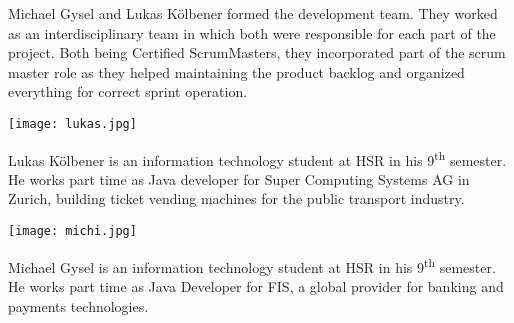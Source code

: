 Michael Gysel and Lukas Kölbener formed the development team. They worked as an interdisciplinary team in which both were responsible for each part of the project. Both being Certified ScrumMasters\textregistered\cite{scrummaster}, they incorporated part of the scrum master role as they helped maintaining the product backlog and organized everything for correct sprint operation.

\begin{minipage}[t]{0.25\textwidth}
	\vspace{0pt}
	\texttt{[image: lukas.jpg]}
\end{minipage}
\begin{minipage}[t]{0.8\textwidth}
	\vspace{20pt}
	Lukas Kölbener is an information technology student at \gls{HSR} in his 9\textsuperscript{th} semester. He works part time as Java developer for Super Computing Systems AG in Zurich, building ticket vending machines for the public transport industry.
	\newline
\end{minipage}

\begin{minipage}[t]{0.25\textwidth}
	\vspace{0pt}
	\texttt{[image: michi.jpg]}
\end{minipage}
\begin{minipage}[t]{0.8\textwidth}
	\vspace{20pt}
	Michael Gysel is an information technology student at \gls{HSR} in his 9\textsuperscript{th} semester. He works part time as Java Developer for FIS, a global provider for banking and payments technologies.
	\newline
\end{minipage}
